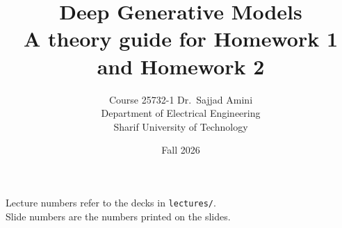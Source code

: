 \documentclass[11pt]{report}
\title{\textcolor{burgundy}{Deep Generative Models}\\[0.4em]
\large A theory guide for Homework 1 and Homework 2}
\author{Course 25732-1 \quad Dr.\ Sajjad Amini\\
Department of Electrical Engineering\\
Sharif University of Technology}
\date{Fall 2026}
\begin{document}
\maketitle
\begin{center}
\textcolor{muted}{Lecture numbers refer to the decks in \texttt{lectures/}.\\
Slide numbers are the numbers printed on the slides.}
\end{center}
\tableofcontents













\end{document}
